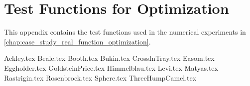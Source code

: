 \chapter{Test Functions for Optimization}
\label{app:test_functions}
  This appendix contains the test functions used in the numerical experiments in 
  \vref{chap:case_study_real_function_optimization}.

  {Ackley.tex}
  {Beale.tex}
  {Booth.tex}
  {Bukin.tex}
  {CrossInTray.tex}
  {Easom.tex}
  {Eggholder.tex}
  {GoldsteinPrice.tex}
  {Himmelblau.tex}
  {Levi.tex}
  {Matyas.tex}
  {Rastrigin.tex}
  {Rosenbrock.tex}
  {Sphere.tex}
  {ThreeHumpCamel.tex}
